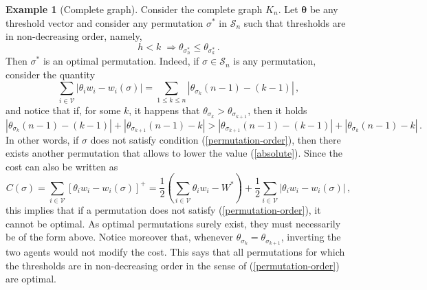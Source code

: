 \documentclass[12pt,twoside,reqno]{amsart}
\theoremstyle{definition}
\newtheorem{example}[theorem]{Example}
\numberwithin{equation}{section}
\newcommand{\be}{\begin{equation}}
\newcommand{\ee}{\end{equation}}
\newcommand{\mc}{\mathcal}
\newcommand{\0}{\mathbf{0}}
\newcommand{\1}{\mathbf{1}}
\newcommand{\thre}{\theta}
\newcommand{\threabs}{\theta}
\newcommand{\Thre}{\mathbf{\theta}}
\newcommand{\we}{W^*}
\begin{document}
\begin{example}[Complete graph] Consider the complete graph $K_{n}$. Let $\Thre$ be any threshold vector and consider any permutation $\sigma^*$ in $\mc S_{n}$ such that thresholds are in non-decreasing order, namely,
\be\label{permutation-order}h<k\;\Rightarrow\theta_{\sigma^*_h}\leq \theta_{\sigma^*_k}\,.\ee
Then $\sigma^*$ is an optimal permutation. Indeed, if $\sigma\in\mc S_{n}$ is any permutation, consider the quantity
\be\label{absolute}\sum\limits_{i\in\mc V}|\theta_iw_i-w_i(\sigma)|=\sum\limits_{1\le k\le n}|\theta_{\sigma_k}(n-1)-(k-1)|\,,\ee
and notice that if, for some $k$, it happens that $\theta_{\sigma_k}>\theta_{\sigma_{k+1}}$, then it holds
$$ |\theta_{\sigma_k}(n-1)-(k-1)|+|\theta_{\sigma_{k+1}}(n-1)-k|>
|\theta_{\sigma_{k+1}}(n-1)-(k-1)|+|\theta_{\sigma_{k}}(n-1)-k|\,.$$
In other words, if $\sigma$ does not satisfy condition (\ref{permutation-order}), then there exists another permutation that allows to lower the value (\ref{absolute}).
Since the cost can also be written as 
$$C(\sigma)=\sum_{i\in\mc V}[\theta_iw_i-w_i(\sigma)]^+=\frac{1}{2}\left(\sum\limits_{i\in\mc V}\theta_iw_i-\we\right)+\frac{1}{2}\sum_{i\in\mc V}|\theta_iw_i-w_i(\sigma)|\,,$$
this implies that if a permutation does not satisfy  (\ref{permutation-order}), it cannot be optimal. As optimal permutations surely exist, they must necessarily be of the form above. Notice moreover that, whenever $\theta_{\sigma_k}=\theta_{\sigma_{k+1}}$, inverting the two agents would not modify the cost. This says that all permutations for which the thresholds are in non-decreasing order in the sense of (\ref{permutation-order}) are optimal.
\end{example}

%
\end{document}
